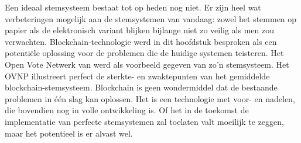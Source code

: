 	Een ideaal stemsysteem bestaat tot op heden nog niet. Er zijn heel wat verbeteringen mogelijk aan de stemsystemen van vandaag: zowel het stemmen op papier als de elektronisch variant blijken bijlange niet zo veilig als men zou verwachten. Blockchain-technologie werd in dit hoofdstuk besproken als een potentiële oplossing voor de problemen die de huidige systemen teisteren. Het Open Vote Netwerk van \textcite{McCorry2017} werd als voorbeeld gegeven van zo'n stemsysteem. Het OVNP illustreert perfect de sterkte- en zwaktepunten van het gemiddelde blockchain-stemsysteem. Blockchain is geen wondermiddel dat de bestaande problemen in één slag kan oplossen. Het is een technologie met  voor- en nadelen, die bovendien nog in volle ontwikkeling is. Of het in de toekomst de implementatie van perfecte stemsystemen zal toelaten valt moeilijk te zeggen, maar het potentieel is er alvast wel. 
	
	

	
	
	
		
		
		
		
		
		
	